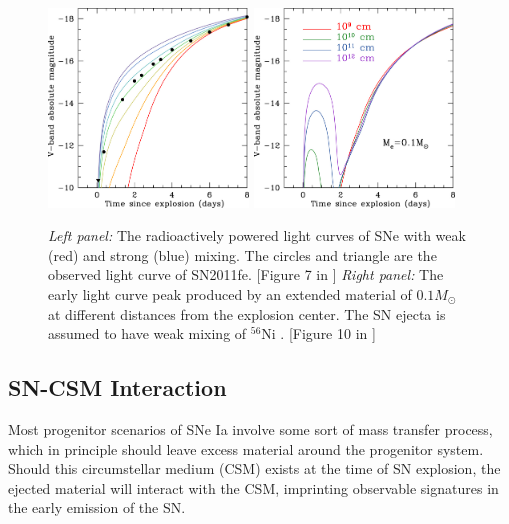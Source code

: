 \documentclass[11pt]{article}
\begin{document}
\begin{figure}[htb]
  \centering
  \includegraphics[width=0.475\textwidth]{deposition.jpg}
  \includegraphics[width=0.475\textwidth]{extended_material.jpg}
  \caption{
    \textit{Left panel:}
    The radioactively powered light curves of SNe with weak
    (red) and strong (blue) mixing. The circles and triangle are the
    observed light curve of SN2011fe. [Figure 7 in
    \citet{2016ApJ...826...96P}]
    \textit{Right panel:}
    The early light curve peak produced by an extended material of
    $0.1M_\odot$ at different distances from the explosion center.
    The SN ejecta is assumed to have weak mixing of $^{56}$Ni .
    [Figure 10 in \citet{2016ApJ...826...96P}]
  }
  \label{fig:early_light_curve}
\end{figure}

\subsection{SN-CSM Interaction}
\label{sec:sn_csm_interaction}

Most progenitor scenarios of SNe Ia involve some sort of mass transfer
process, which in principle should leave excess material around the
progenitor system.  Should this circumstellar medium (CSM) exists at
the time of SN explosion, the ejected material will interact with the
CSM, imprinting observable signatures in the early emission of the SN.
\end{document}
